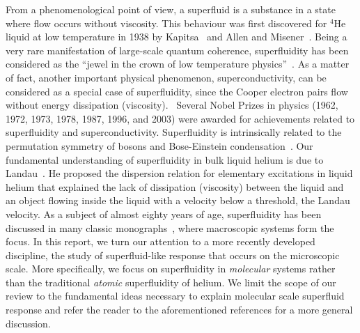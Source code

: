\documentclass[12pt]{iopart}
\begin{document}
From a phenomenological point of view, a superfluid is a substance in a state where flow occurs without viscosity. 
This behaviour was first discovered for $^4$He liquid at low temperature in 1938 by Kapitsa~\cite{superfluid_discovery_1} and Allen and Misener~\cite{superfluid_discovery_2}. 
Being a very rare manifestation of large-scale quantum coherence, superfluidity has been considered 
as the ``jewel in the crown of low temperature physics''~\cite{basic_superflu}.
As a matter of fact, another important physical phenomenon, superconductivity, can be considered as a special case of superfluidity, since the Cooper electron pairs flow without energy dissipation (viscosity).~\cite{tilley_book}
Several Nobel Prizes in physics (1962, 1972, 1973, 1978, 1987, 1996, and 2003) were awarded for achievements related to superfluidity and
superconductivity. 
Superfluidity is intrinsically related to the permutation symmetry of bosons and Bose-Einstein condensation~\cite{london_superflu_bec,feynman_sf1,feynman_sf2,feynman_sf3}.
Our fundamental understanding of superfluidity in bulk liquid helium is due to Landau~\cite{landau41,landau47}.
He proposed the dispersion relation for elementary excitations in liquid helium that explained the lack of dissipation (viscosity) between the liquid and an object flowing inside the liquid with a velocity below a threshold, the Landau velocity. 
As a subject of almost eighty years of age, superfluidity has been discussed in many classic monographs~\cite{basic_superflu,tilley_book,khalatnikov_book, clark_derrick, nozieres_pines,dalfovo_bec_rmp,untracold_qf_stoof,annett_super_book}, where macroscopic systems form the focus. 
In this report, we turn our attention to a more recently developed discipline, the study of superfluid-like response that occurs on the microscopic scale. 
More specifically, we focus on superfluidity in {\em molecular} systems rather than the traditional {\em atomic} superfluidity of helium. 
We limit the scope of our review to the fundamental ideas necessary to explain molecular scale superfluid response and refer the reader
to the aforementioned references for a more general discussion.
\end{document}
